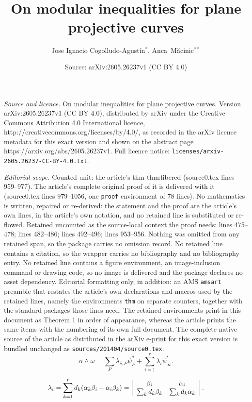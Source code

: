 \documentclass[10pt,a4paper]{amsart}
\title{On modular inequalities for plane projective curves}
\author{Jose Ignacio Cogolludo-Agust\'in$^*$, Anca~M\u acinic$^{**}$}
\date{Source: arXiv:2605.26237v1 (CC BY 4.0)}
\begin{document}
\maketitle

\noindent\emph{Source and licence.} On modular inequalities for plane projective curves. Version arXiv:2605.26237v1 (CC BY 4.0), distributed by arXiv under the Creative Commons Attribution 4.0 International licence, http://creativecommons.org/licenses/by/4.0/, as recorded in the arXiv licence metadata for this exact version and shown on the abstract page https://arxiv.org/abs/2605.26237v1. Full licence notice: \texttt{licenses/arxiv-2605.26237-CC-BY-4.0.txt}.\par\smallskip

\noindent\textit{Editorial scope.} Counted unit: the article's thm thm:fibered (source0.tex lines 959--977). The article's complete original proof of it is delivered with it (source0.tex lines 979--1056, one \texttt{proof} environment of 78 lines). No mathematics is written, repaired or re-derived: the statement and the proof are the article's own lines, in the article's own notation, and no retained line is substituted or re-flowed.  Retained uncounted as the source-local context the proof needs: lines 475--478; lines 482--486; lines 492--496; lines 953--956.  Nothing was omitted from any retained span, so the package carries no omission record.  No retained line contains a citation, so the wrapper carries no bibliography and no bibliography entry.  No retained line contains a figure environment, an image-inclusion command or drawing code, so no image is delivered and the package declares no asset dependency.  Editorial formatting only, in addition: an AMS \texttt{amsart} preamble that restates the article's own declarations and macros used by the retained lines, namely the environments \texttt{thm} on separate counters, together with the standard packages those lines need.  The retained environments print in this document as Theorem 1 in order of appearance, whereas the article prints the same items with the numbering of its own full document.  The complete native source of the article as distributed in the arXiv e-print for this exact version is bundled unchanged as \texttt{sources/201404/source0.tex}.
\begin{equation}
\label{eq:awb}
\alpha\wedge \omega=\sum_P \lambda_{\delta,P} \bar\psi_P^\delta + \sum_{i=1}^r \lambda_i \bar\psi^i_\infty.
\end{equation}

\begin{equation}
\label{eq:lambda_i}
    \lambda_i=\sum_{k=1}^r d_k(\alpha_k\beta_i-\alpha_i\beta_k)=
\left| \array{cc} \beta_i & \alpha_i \\ \sum_k d_k\beta_k & \sum_k d_k\alpha_k \endarray\right|.
\end{equation}
\end{document}
